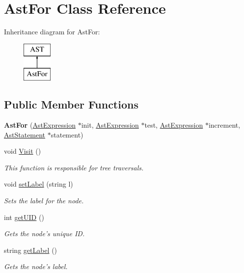 \hypertarget{classAstFor}{\section{Ast\-For Class Reference}
\label{classAstFor}
}
Inheritance diagram for Ast\-For\-:\begin{figure}[H]
\begin{center}
\leavevmode
\includegraphics[height=2.000000cm]{classAstFor}
\end{center}
\end{figure}
\subsection*{Public Member Functions}
\begin{DoxyCompactItemize}
\item 
\hypertarget{classAstFor_af4b510c833d8cb2b64e5ba1d700b6e1b}{{\bfseries Ast\-For} (\hyperlink{classAstExpression}{Ast\-Expression} $\ast$init, \hyperlink{classAstExpression}{Ast\-Expression} $\ast$test, \hyperlink{classAstExpression}{Ast\-Expression} $\ast$increment, \hyperlink{classAstStatement}{Ast\-Statement} $\ast$statement)}\label{classAstFor_af4b510c833d8cb2b64e5ba1d700b6e1b}

\item 
void \hyperlink{classAstFor_aabb94ea30de2b634b35c02ec3688d0ff}{Visit} ()
\begin{DoxyCompactList}\small\item\em This function is responsible for tree traversals. \end{DoxyCompactList}\item 
void \hyperlink{classAST_a71d680856e95ff89f55d5311a552eba6}{set\-Label} (string l)
\begin{DoxyCompactList}\small\item\em Sets the label for the node. \end{DoxyCompactList}\item 
int \hyperlink{classAST_ab7a5b1d9f1c2de0d98deb356f724a42c}{get\-U\-I\-D} ()
\begin{DoxyCompactList}\small\item\em Gets the node's unique I\-D. \end{DoxyCompactList}\item 
string \hyperlink{classAST_aee029be902fffc927d16ccb03eb922ad}{get\-Label} ()
\begin{DoxyCompactList}\small\item\em Gets the node's label. \end{DoxyCompactList}\end{DoxyCompactItemize}
